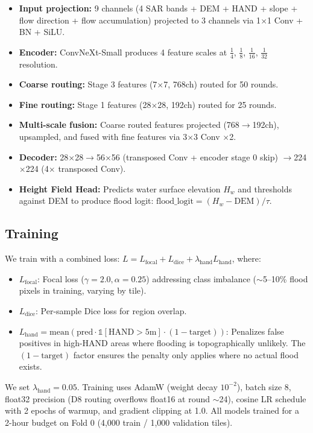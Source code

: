 \documentclass[journal]{IEEEtran}
\begin{document}
\begin{itemize}
    \item \textbf{Input projection:} 9 channels (4 SAR bands + DEM + HAND + slope + flow direction + flow accumulation) projected to 3 channels via 1$\times$1 Conv + BN + SiLU.
    \item \textbf{Encoder:} ConvNeXt-Small produces 4 feature scales at $\frac{1}{4}$, $\frac{1}{8}$, $\frac{1}{16}$, $\frac{1}{32}$ resolution.
    \item \textbf{Coarse routing:} Stage 3 features (7$\times$7, 768ch) routed for 50 rounds.
    \item \textbf{Fine routing:} Stage 1 features (28$\times$28, 192ch) routed for 25 rounds.
    \item \textbf{Multi-scale fusion:} Coarse routed features projected (768$\to$192ch), upsampled, and fused with fine features via 3$\times$3 Conv $\times$2.
    \item \textbf{Decoder:} 28$\times$28$\to$56$\times$56 (transposed Conv + encoder stage 0 skip) $\to$224$\times$224 (4$\times$ transposed Conv).
    \item \textbf{Height Field Head:} Predicts water surface elevation $H_w$ and thresholds against DEM to produce flood logit: $\text{flood\_logit} = (H_w - \text{DEM}) / \tau$.
\end{itemize}

\subsection{Training}
We train with a combined loss: $L = L_{\text{focal}} + L_{\text{dice}} + \lambda_{\text{hand}} L_{\text{hand}}$, where:
\begin{itemize}
    \item $L_{\text{focal}}$: Focal loss ($\gamma=2.0, \alpha=0.25$) addressing class imbalance ($\sim$5--10\% flood pixels in training, varying by tile).
    \item $L_{\text{dice}}$: Per-sample Dice loss for region overlap.
    \item $L_{\text{hand}} = \text{mean}(\text{pred} \cdot \mathbb{1}[\text{HAND}>5\text{m}] \cdot (1 - \text{target}))$: Penalizes false positives in high-HAND areas where flooding is topographically unlikely. The $(1 - \text{target})$ factor ensures the penalty only applies where no actual flood exists.
\end{itemize}
We set $\lambda_{\text{hand}} = 0.05$. Training uses AdamW (weight decay $10^{-2}$), batch size 8, float32 precision (D8 routing overflows float16 at round $\sim$24), cosine LR schedule with 2 epochs of warmup, and gradient clipping at 1.0. All models trained for a 2-hour budget on Fold 0 (4,000 train / 1,000 validation tiles).
\end{document}
